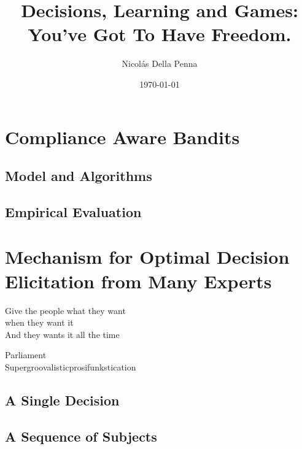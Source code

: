 \documentclass[11pt, a4paper]{book}
\title{Decisions, Learning and Games: \\ You've Got To Have Freedom.}
\author{Nicol\'as Della Penna}
\date{\today}
\begin{document}
\pagestyle{empty}
\thispagestyle{empty}



\cleardoublepage
\pagestyle{empty}


\cleardoublepage
\pagestyle{empty}


\cleardoublepage
\pagestyle{headings}


\cleardoublepage
\pagestyle{headings}
\tableofcontents
\listoffigures
\listoftables

\mainmatter




\part{Compliance Aware Bandits}

\chapter{Model and Algorithms} \label{cha:bandit}





\chapter{Empirical Evaluation} \label{cha:empirical}



\part{Mechanism for Optimal Decision Elicitation from Many Experts}


\epigraph{Give the people what they want\\ when they want it \\
And they wants it all the time}{Parliament \\ Supergroovalisticprosifunkstication}

\chapter{A Single Decision} \label{cha:market}


\chapter{A Sequence of Subjects} \label{cha:twosided}

\end{document}
